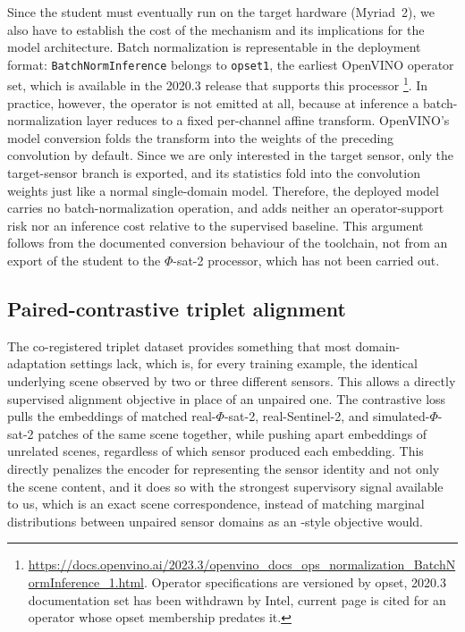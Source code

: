 Since the student must eventually run on the target hardware (Myriad~2), we also have to establish the cost of the  mechanism and its implications for the model architecture.
Batch normalization is representable in the deployment format: \texttt{BatchNormInference} belongs to \texttt{opset1}, the earliest OpenVINO operator set, which is available in the 2020.3 release that supports this processor
\footnote{\url{https://docs.openvino.ai/2023.3/openvino_docs_ops_normalization_BatchNormInference_1.html}.
    Operator specifications are versioned by opset, 2020.3 documentation set has been withdrawn by Intel, current page is cited for an operator whose opset membership predates it.
}.
In practice, however, the operator is not emitted at all, because at inference a batch-normalization layer reduces to a fixed per-channel affine transform.
OpenVINO's model conversion folds the transform into the weights of the preceding convolution by default.
Since we are only interested in the target sensor, only the target-sensor branch is exported, and its statistics fold into the convolution weights just like a normal single-domain model.
Therefore, the deployed model carries no batch-normalization operation, and  adds neither an operator-support risk nor an inference cost relative to the supervised baseline.
This argument follows from the documented conversion behaviour of the toolchain, not from an export of the student to the $\Phi$-sat-2 processor, which has not been carried out.

\subsection{Paired-contrastive triplet alignment}
\label{sec:contrastive-mechanism}

The co-registered triplet dataset provides something that most domain-adaptation settings lack, which is, for every training example, the identical underlying scene observed by two or three different sensors.
This allows a directly supervised alignment objective in place of an unpaired one.
The contrastive loss pulls the embeddings of matched real-$\Phi$-sat-2, real-Sentinel-2, and simulated-$\Phi$-sat-2 patches of the same scene together, while pushing apart embeddings of unrelated scenes, regardless of which sensor produced each embedding.
This directly penalizes the encoder for representing the sensor identity and not only the scene content, and it does so with the strongest supervisory signal available to us, which is an exact scene correspondence, instead of matching marginal distributions between unpaired sensor domains as an -style objective would.

